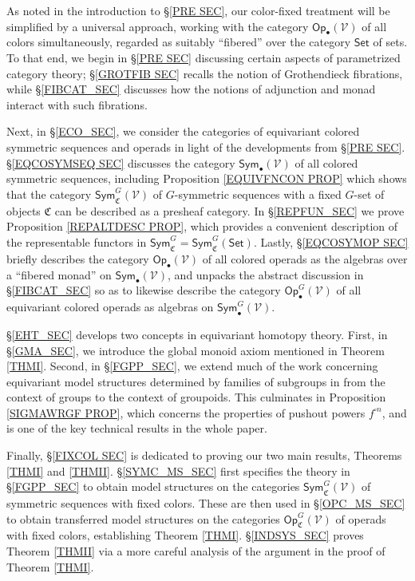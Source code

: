 \documentclass[a4paper,10pt
,draft
]{article}%
\numberwithin{equation}{section}
\numberwithin{figure}{section}
\theoremstyle{definition} %
\newcommand{\Op}{\mathsf{Op}}%
\newcommand{\V}{\ensuremath{\mathcal V}}
\newcommand{\1}{\ensuremath{\mathbbm 1}}%
\begin{document}
As noted in the introduction to 
\S \ref{PRE SEC}, our color-fixed treatment will be simplified by a universal approach,
working with the category $\Op_\bullet(\V)$ of all colors simultaneously,
regarded as suitably ``fibered'' over the category $\mathsf{Set}$
of sets.
To that end, 
we begin in \S \ref{PRE SEC} discussing certain aspects of parametrized category theory;
\S \ref{GROTFIB SEC}
recalls the notion of Grothendieck fibrations, 
while \S \ref{FIBCAT_SEC}
discusses how the notions of adjunction and monad %
interact with such fibrations.

Next, in \S \ref{ECO_SEC}, we consider the categories of
equivariant colored symmetric sequences and operads in light of the developments from \S \ref{PRE SEC}.
\S \ref{EQCOSYMSEQ SEC}
discusses the category
$\mathsf{Sym}_{\bullet}(\V)$
of all colored symmetric sequences,
including
Proposition \ref{EQUIVFNCON PROP}
which shows that the category
$\mathsf{Sym}^G_{\mathfrak{C}}(\V)$
of $G$-symmetric sequences with a fixed $G$-set of objects
$\mathfrak{C}$ can be described as a presheaf category.
In \S \ref{REPFUN_SEC} we prove
Proposition \ref{REPALTDESC PROP},
which provides a convenient description of the representable functors in 
$\mathsf{Sym}^G_{\mathfrak{C}} = \mathsf{Sym}^G_{\mathfrak{C}}(\mathsf{Set})$.
%
Lastly, \S \ref{EQCOSYMOP SEC}
briefly describes the category 
$\mathsf{Op}_{\bullet}(\V)$ 
of all colored operads as the algebras over a ``fibered monad''
on  
$\mathsf{Sym}_{\bullet}(\V)$,
and unpacks the abstract discussion in \S \ref{FIBCAT_SEC}
so as to likewise describe the category 
$\mathsf{Op}_{\bullet}^G(\V)$ 
of all equivariant colored operads
as algebras on 
$\mathsf{Sym}^G_{\bullet}(\V)$.

\S \ref{EHT_SEC} develops two concepts in equivariant homotopy theory.
First, in \S \ref{GMA_SEC}, we introduce the global monoid axiom mentioned in Theorem \ref{THMI}.
Second, in \S \ref{FGPP_SEC}, 
we extend much of the work 
concerning equivariant model structures determined by families of subgroups in \cite[\S 6]{BP_geo}
from the context of groups to the context of groupoids.
This culminates in 
Proposition \ref{SIGMAWRGF PROP},
which concerns the properties of pushout powers $f^{\square n}$,
and is one of the key technical results in the whole paper. %


Finally, \S \ref{FIXCOL SEC}
is dedicated to proving our two main results, Theorems \ref{THMI} and \ref{THMII}.
%
\S \ref{SYMC_MS_SEC} first specifies the theory in
\S \ref{FGPP_SEC}
to obtain model structures on the categories
$\mathsf{Sym}^G_{\mathfrak{C}}(\V)$ of symmetric sequences with fixed colors.
These are then used in \S \ref{OPC_MS_SEC}
to obtain transferred model structures on the 
categories
$\mathsf{Op}^G_{\mathfrak{C}}(\V)$
of operads with fixed colors, establishing Theorem \ref{THMI}.
\S \ref{INDSYS_SEC} proves Theorem \ref{THMII}
via a more careful analysis of the argument in the proof of 
Theorem \ref{THMI}.
\end{document}
